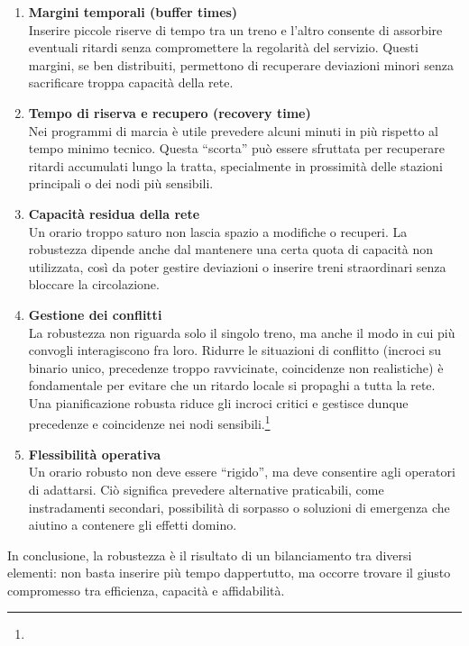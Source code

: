 \documentclass{report}
\newcommand{\fnShort}[2][]{\footnote{\footshorthand[#1]{#2}}}
\begin{document}
\begin{enumerate}

    \item \textbf{Margini temporali (buffer times)} \\
    Inserire piccole riserve di tempo tra un treno e l’altro consente di assorbire eventuali ritardi senza compromettere la regolarità del servizio. Questi margini, se ben distribuiti, permettono di recuperare deviazioni minori senza sacrificare troppa capacità della rete.

    \item \textbf{Tempo di riserva e recupero (recovery time)} \\
    Nei programmi di marcia è utile prevedere alcuni minuti in più rispetto al tempo minimo tecnico. Questa “scorta” può essere sfruttata per recuperare ritardi accumulati lungo la tratta, specialmente in prossimità delle stazioni principali o dei nodi più sensibili.

    \item \textbf{Capacità residua della rete} \\
    Un orario troppo saturo non lascia spazio a modifiche o recuperi. La robustezza dipende anche dal mantenere una certa quota di capacità non utilizzata, così da poter gestire deviazioni o inserire treni straordinari senza bloccare la circolazione.

    \item \textbf{Gestione dei conflitti} \\
    La robustezza non riguarda solo il singolo treno, ma anche il modo in cui più convogli interagiscono fra loro. Ridurre le situazioni di conflitto (incroci su binario unico, precedenze troppo ravvicinate, coincidenze non realistiche) è fondamentale per evitare che un ritardo locale si propaghi a tutta la rete. Una pianificazione robusta riduce gli incroci critici e gestisce dunque precedenze e coincidenze nei nodi sensibili.\fnShort{Dewilde2013}


    \item \textbf{Flessibilità operativa} \\
    Un orario robusto non deve essere “rigido”, ma deve consentire agli operatori di adattarsi. Ciò significa prevedere alternative praticabili, come instradamenti secondari, possibilità di sorpasso o soluzioni di emergenza che aiutino a contenere gli effetti domino.

    \end{enumerate}
    
    In conclusione, la robustezza è il risultato di un bilanciamento tra diversi elementi: non basta inserire più tempo dappertutto, ma occorre trovare il giusto compromesso tra efficienza, capacità e affidabilità.
\end{document}

